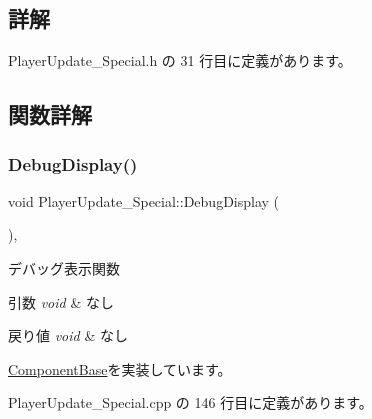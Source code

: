 \subsection{詳解}


 Player\+Update\+\_\+\+Special.\+h の 31 行目に定義があります。



\subsection{関数詳解}
\mbox{\label{class_player_update___special_a6253000b53b2c5bc73ce0ed4d3b4a82a}} 
\subsubsection{\texorpdfstring{Debug\+Display()}{DebugDisplay()}}
{\footnotesize\ttfamily void Player\+Update\+\_\+\+Special\+::\+Debug\+Display (\begin{DoxyParamCaption}{ }\end{DoxyParamCaption})\hspace{0.3cm}{\ttfamily [override]}, {\ttfamily [virtual]}}



デバッグ表示関数 


\begin{DoxyParams}{引数}
{\em void} & なし \\
\hline
\end{DoxyParams}

\begin{DoxyRetVals}{戻り値}
{\em void} & なし \\
\hline
\end{DoxyRetVals}


\mbox{\hyperlink{class_component_base_a36ae7d27ad9d756fa245bad443020407}{Component\+Base}}を実装しています。



 Player\+Update\+\_\+\+Special.\+cpp の 146 行目に定義があります。

\mbox{\label{class_player_update___special_a48906da6915325d92d5cc6ec67212259}} 

